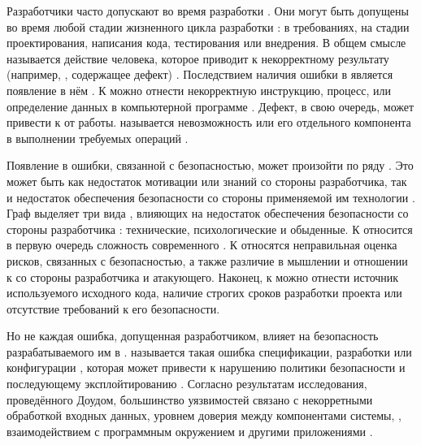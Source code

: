 %
Разработчики часто допускают  во время разработки . 
%
Они могут быть допущены во время любой стадии жизненного цикла разработки : в требованиях, на стадии проектирования, написания кода, тестирования или внедрения. 
%
В общем смысле  называется действие человека, которое приводит к некорректному результату (например, , содержащее дефект) . 
%
Последствием наличия ошибки в  является появление в нём . 
%
К  можно отнести некорректную инструкцию, процесс, или определение данных в компьютерной программе . 
%
Дефект, в свою очередь, может привести к   от работы. 
%
 называется невозможность  или его отдельного компонента в выполнении требуемых операций .

%
Появление в  ошибки, связанной с безопасностью, может произойти по ряду . 
%
Это может быть как недостаток мотивации или знаний со стороны разработчика, так и недостаток обеспечения безопасности со стороны применяемой им технологии . 
%
Граф выделяет три вида , влияющих на недостаток обеспечения безопасности со стороны разработчика : технические, психологические и обыденные. 
%
К  относится в первую очередь сложность современного . 
%
К  относятся неправильная оценка рисков, связанных с безопасностью, а также различие в мышлении и отношении к  со стороны разработчика и атакующего. 
%
Наконец, к  можно отнести источник используемого исходного кода, наличие строгих сроков разработки проекта или отсутствие требований к его безопасности.

%
Но не каждая ошибка, допущенная разработчиком, влияет на безопасность разрабатываемого им в . 
%
 называется такая ошибка спецификации, разработки или конфигурации , которая может привести к нарушению политики безопасности и последующему эксплойтированию     .
%
Согласно результатам исследования, проведённого Доудом, большинство уязвимостей связано с некорретными обработкой входных данных, уровнем доверия между компонентами системы, , взаимодействием с программным окружением и другими приложениями . 

